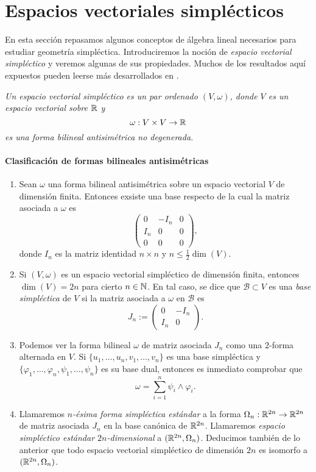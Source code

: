 \section{Espacios vectoriales simplécticos}\label{sec:vectoriales}
En esta sección repasamos algunos conceptos de álgebra lineal necesarios para estudiar geometría simpléctica. Introduciremos la noción de \emph{espacio vectorial simpléctico} y veremos algunas de sus propiedades. Muchos de los resultados aquí expuestos pueden leerse más desarrollados en \cite{algebra}.
\begin{defn}
  \em
Un \emph{espacio vectorial simpléctico} es un par ordenado $(V,\omega)$, donde $V$ es un espacio vectorial sobre $\mathbb{R}$ y 
	\[
	  \omega: V \times V \rightarrow \mathbb{R}
	\]
	es una forma bilineal antisimétrica no degenerada.
\end{defn}

\paragraph{\bf Clasificación de formas bilineales antisimétricas}
  \begin{enumerate}
    \item Sean $\omega$ una forma bilineal antisimétrica sobre un espacio vectorial $V$ de dimensión finita. Entonces exsiste una base respecto de la cual la matriz asociada a $\omega$ es
      \[
	\left(
	\begin{array}{ccc}
	  0 & -I_n & 0 \\
	  I_n & 0 & 0 \\
	  0 & 0 & 0
	\end{array}\right),
      \]
      donde $I_n$ es la matriz identidad $n \times n$ y $n\leq \tfrac{1}{2}\dim (V)$.
    \item Si $(V,\omega)$ es un espacio vectorial simpléctico de dimensión finita, entonces $\dim(V)=2n$ para cierto $n \in \mathbb{N}$. En tal caso, se dice que $\mathscr{B}\subset V$ es una \emph{base simpléctica} de $V$ si la matriz asociada a $\omega$ en $\mathscr{B}$ es
\[
  J_n :=
\left(
	\begin{array}{cc}
	  0 & -I_n  \\
	  I_n & 0 
	\end{array}\right).
      \]
    \item Podemos ver la forma bilineal $\omega$ de matriz asociada $J_n$ como una $2$-forma alternada en $V$. Si $\{u_1,\dots,u_n,v_1,\dots,v_n\}$ es una base simpléctica y $\{\varphi_1,\dots, \varphi_n, \psi_1,\dots, \psi_n \}$ es su base dual, entonces es inmediato comprobar que
  \[
    \omega =  \sum_{i=1}^n \psi_i \wedge \varphi_i.
  \]
  \item Llamaremos \emph{$n$-ésima forma simpléctica estándar} a la forma $\Omega_n:\mathbb{R}^{2n} \rightarrow \mathbb{R}^{2n}$ de matriz asociada $J_n$ en la base canónica de $\mathbb{R}^{2n}$. Llamaremos \emph{espacio simpléctico estándar $2n$-dimensional} a $(\mathbb{R}^{2n},\Omega_n)$. Deducimos también de lo anterior que todo espacio vectorial simpléctico de dimensión $2n$ es isomorfo a $(\mathbb{R}^{2n},\Omega_n)$.
\end{enumerate}
